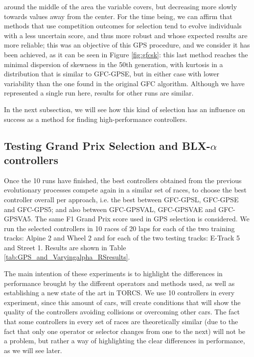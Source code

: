 \documentclass[10pt,journal,compsoc]{IEEEtran}
\begin{document}
around the middle of the area the variable covers, but decreasing more
slowly towards values away from the center. For the time being, we can
affirm that methods that use competition outcomes for selection tend
to evolve individuals with a less uncertain score, and thus more
robust and whose expected
results are more reliable; this was an objective of this GPS
procedure, and we consider it has been achieved, as it can be seen in
Figure \ref{fig:gfcsk}: this last method reaches the minimal
dispersion of skewness in the 50th generation, with kurtosis in a
distribution that is similar to {\sf GFC-GPSE}, but in either case
with lower variability than the one found in the original {\sf GFC} algorithm. Although we have
represented a single run here, results for other runs are similar.

In the next subsection, we will see how this kind of selection has an influence on success as a method for finding high-performance controllers.



\subsection{Testing Grand Prix Selection and BLX-$\alpha$ controllers}

Once the 10 runs have finished, the best controllers obtained from the
previous evolutionary processes compete again in a similar set of
races, to choose the best controller overall per approach,
i.e. the best between {\sf GFC-GPSL}, {\sf GFC-GPSE} and {\sf
  GFC-GPS5}; and also between {\sf GFC-GPSVAL}, {\sf GFC-GPSVAE} and
{\sf GFC-GPSVA5}. The same F1 Grand Prix score used in GPS selection
is considered. We run the selected controllers in 10 races of 20 laps
for each of the two training tracks: Alpine 2  and Wheel 2  and  for
each of the two testing tracks: E-Track 5 and Street 1. Results are
shown in Table \ref{tab:GPS_and_Varyingalpha_RSresults}.

The main intention of these experiments is to
  highlight the differences in performance brought by the different
  operators and methods used, as well as establishing a new state of
  the art in TORCS. We use 10 controllers in every experiment, since
  this amount of cars, will create conditions that will show the
  quality of the controllers avoiding collisions or overcoming other
  cars. The fact that some controllers in every set of races are theoretically similar (due to the fact that only one operator or selector changes from one to the next) will not be a problem, but rather a way of highlighting the clear differences in
  performance, as we will see later.
\end{document}

